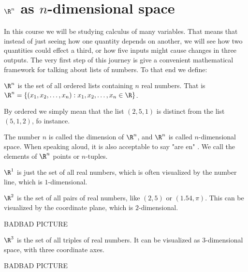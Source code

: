 
\section{$\R^n$ as $n$-dimensional space}

In this course we will be studying calculus of many variables.  That means that instead of just seeing how one quantity depends on another, we will see
how two quantities could effect a third, or how five inputs might cause changes in three outputs.  The very first step of this journey is give a convenient mathematical 
framework for talking about lists of numbers.  To that end we define:

\begin{definition}
  $\R^n$ is the set of all ordered lists containing $n$ real numbers.  That is $\R^n = \{ (x_1,x_2,\dots, x_n) : x_1,x_2,\dots, x_n \in \R \}$.
\end{definition}

By ordered we simply mean that the list $(2,5,1)$ is distinct from the list $(5,1,2)$, fo instance.

The number $n$ is called the dimension of $\R^n$, and $\R^n$ is called $n$-dimensional space.  When speaking aloud, it is also acceptable to say "are en" .
 We call the elements of $\R^n$ points or $n$-tuples.

\begin{example}
	$\R^1$ is just the set of all real numbers, which is often visualized by the number line, which is $1$-dimensional.
\end{example}



\begin{example}
	$\R^2$ is the set of all pairs of real numbers, like $(2,5)$ or $(1.54,\pi)$. This can be visualized by the coordinate plane, which is $2$-dimensional.
	
	BADBAD PICTURE
	
\end{example}


\begin{example}
	$\R^3$ is the set of all triples of real numbers.  It can be visualized as $3$-dimensional space, with three coordinate axes. 
	
	BADBAD PICTURE
\end{example}

